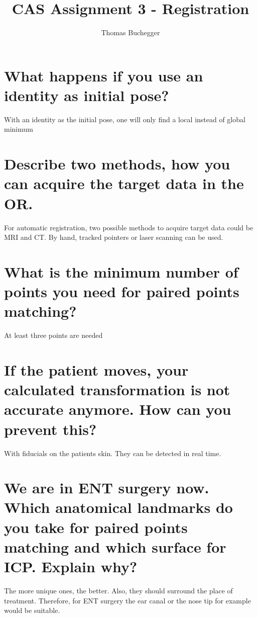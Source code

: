 \documentclass[12pt]{article}
\begin{document}


\title{CAS Assignment 3 - Registration}%
\author{Thomas Buchegger}

\maketitle

\section*{What happens if you use an identity as initial pose?}
With an identity as the initial pose, one will only find a local instead of global minimum

\section*{Describe two methods, how you can acquire the target data in the OR.}
For automatic registration, two possible methods to acquire target data could be MRI and CT.
By hand, tracked pointers or laser scanning can be used.

\section*{What is the minimum number of points you need for paired points matching?}
At least three points are needed

\section*{If the patient moves, your calculated transformation is not accurate anymore. How can you prevent this?}
With fiducials on the patients skin. They can be detected in real time.

\section*{We are in ENT surgery now. Which anatomical landmarks do you take for paired points matching and which surface for ICP. Explain why?}
The more unique ones, the better. Also, they should surround the place of treatment. Therefore, for ENT surgery the
ear canal or the nose tip for example would be suitable.
\end{document}
